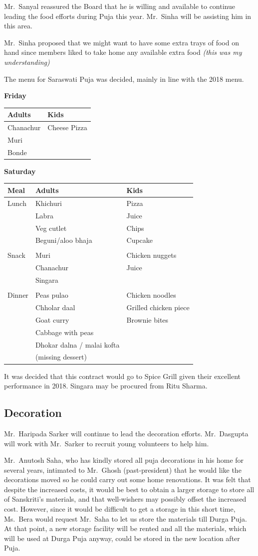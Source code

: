 \documentclass[12pt,]{article}
\begin{document}
Mr.~Sanyal reassured the Board that he is willing and available to
continue leading the food efforts during Puja this year. Mr.~Sinha will
be assisting him in this area.

Mr.~Sinha proposed that we might want to have some extra trays of food
on hand since members liked to take home any available extra food
\emph{(this was my understanding)}

The menu for Saraswati Puja was decided, mainly in line with the 2018
menu.

\textbf{Friday}

\begin{longtable}[]{@{}ll@{}}
\toprule
Adults & Kids\tabularnewline
\midrule
\endhead
Chanachur & Cheese Pizza\tabularnewline
Muri &\tabularnewline
Bonde &\tabularnewline
\bottomrule
\end{longtable}

\textbf{Saturday}

\begin{longtable}[]{@{}lll@{}}
\toprule
Meal & Adults & Kids\tabularnewline
\midrule
\endhead
Lunch & Khichuri & Pizza\tabularnewline
& Labra & Juice\tabularnewline
& Veg cutlet & Chips\tabularnewline
& Beguni/aloo bhaja & Cupcake\tabularnewline
& &\tabularnewline
Snack & Muri & Chicken nuggets\tabularnewline
& Chanachur & Juice\tabularnewline
& Singara &\tabularnewline
& &\tabularnewline
Dinner & Peas pulao & Chicken noodles\tabularnewline
& Chholar daal & Grilled chicken piece\tabularnewline
& Goat curry & Brownie bites\tabularnewline
& Cabbage with peas &\tabularnewline
& Dhokar dalna / malai kofta &\tabularnewline
& (missing dessert) &\tabularnewline
\bottomrule
\end{longtable}

It was decided that this contract would go to Spice Grill given their
excellent performance in 2018. Singara may be procured from Ritu Sharma.

\hypertarget{decoration}{%
\subsection{Decoration}\label{decoration}}

Mr.~Haripada Sarker will continue to lead the decoration efforts.
Mr.~Dasgupta will work with Mr.~Sarker to recruit young volunteers to
help him.

Mr.~Anutosh Saha, who has kindly stored all puja decorations in his home
for several years, intimated to Mr.~Ghosh (past-president) that he would
like the decorations moved so he could carry out some home renovations.
It was felt that despite the increased costs, it would be best to obtain
a larger storage to store all of Sanskriti's materials, and that
well-wishers may possibly offset the increased cost. However, since it
would be difficult to get a storage in this short time, Ms.~Bera would
request Mr.~Saha to let us store the materials till Durga Puja. At that
point, a new storage facility will be rented and all the materials,
which will be used at Durga Puja anyway, could be stored in the new
location after Puja.
\end{document}
